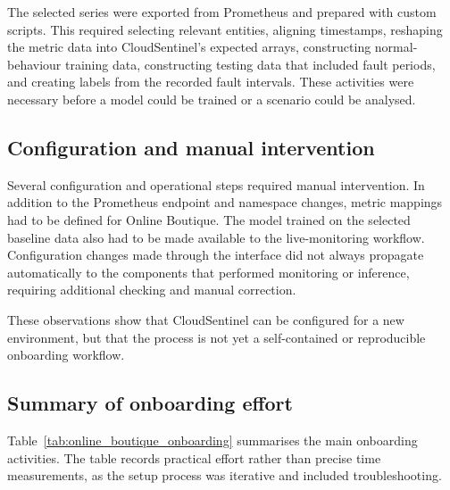 The selected series were exported from Prometheus and prepared with custom scripts. This required selecting relevant entities, aligning timestamps, reshaping the metric data into CloudSentinel's expected arrays, constructing normal-behaviour training data, constructing testing data that included fault periods, and creating labels from the recorded fault intervals. These activities were necessary before a model could be trained or a scenario could be analysed.

\subsection{Configuration and manual intervention}
Several configuration and operational steps required manual intervention. In addition to the Prometheus endpoint and namespace changes, metric mappings had to be defined for Online Boutique. The model trained on the selected baseline data also had to be made available to the live-monitoring workflow. Configuration changes made through the interface did not always propagate automatically to the components that performed monitoring or inference, requiring additional checking and manual correction.

These observations show that CloudSentinel can be configured for a new environment, but that the process is not yet a self-contained or reproducible onboarding workflow.

\subsection{Summary of onboarding effort}
Table~\ref{tab:online_boutique_onboarding} summarises the main onboarding activities. The table records practical effort rather than precise time measurements, as the setup process was iterative and included troubleshooting.

